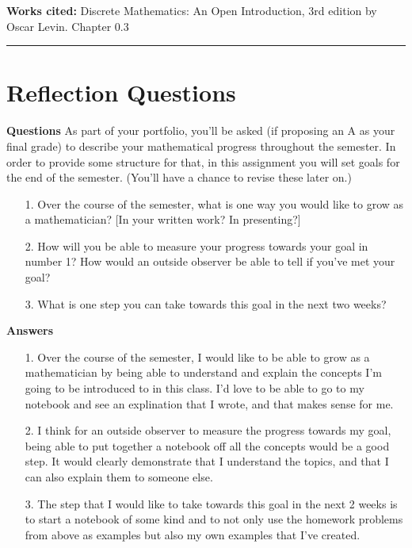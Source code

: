 \documentclass{article}
\begin{document}
\vspace{0.5cm}
\textbf{Works cited:}
Discrete Mathematics: An Open Introduction, 3rd edition by Oscar Levin. Chapter 0.3


\vspace{0.5cm}
\hrule
\vspace{0.5cm}

\section*{Reflection Questions}
\textbf{Questions}
As part of your portfolio, you'll be asked (if proposing an A as your final grade) to describe your mathematical progress throughout the semester.  In order to provide some structure for that, in this assignment you will set goals for the end of the semester.  (You'll have a chance to revise these later on.)
\begin{enumerate}
    \item[1.]Over the course of the semester, what is one way you would like to grow as a mathematician? [In your written work? In presenting?]
    \item[2.]How will you be able to measure your progress towards your goal in number 1? How would an outside observer be able to tell if you've met your goal?
    \item[3.]What is one step you can take towards this goal in the next two weeks? 
\end{enumerate}
\textbf{Answers}
\begin{enumerate}
\item[1.]Over the course of the semester, I would like to be able to grow as a mathematician by being able to understand and explain the concepts I'm going to be introduced to in this class. I'd love to be able to go to my notebook and see an explination that I wrote, and that makes sense for me.

\item[2.]I think for an outside observer to measure the progress towards my goal, being able to put together a notebook off all the concepts would be a good step. It would clearly demonstrate that I understand the topics, and that I can also explain them to someone else.

\item[3.]The step that I would like to take towards this goal in the next 2 weeks is to start a notebook of some kind and to not only use the homework problems from above as examples but also my own examples that I've created.
\end{enumerate}
\end{document}
